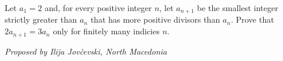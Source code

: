Let $a_1=2$ and, for every positive integer $n$, let $a_{n+1}$ be the smallest integer strictly greater than $a_n$ that has more positive divisors than $a_n$. Prove that $2a_{n+1}=3a_n$ only for finitely many indicies $n$.

\textit{ Proposed by Ilija Jovčevski, North Macedonia}